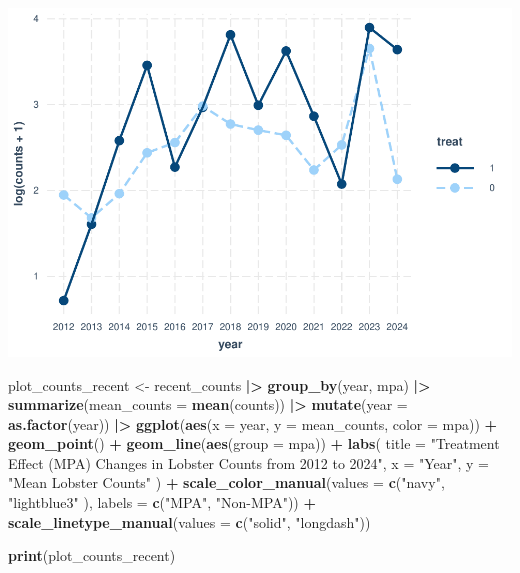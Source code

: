 \documentclass[
]{article}
\newenvironment{Shaded}{\begin{snugshade}}{\end{snugshade}}
\newcommand{\AttributeTok}[1]{\textcolor[rgb]{0.13,0.29,0.53}{#1}}
\newcommand{\FunctionTok}[1]{\textcolor[rgb]{0.13,0.29,0.53}{\textbf{#1}}}
\newcommand{\NormalTok}[1]{#1}
\newcommand{\OtherTok}[1]{\textcolor[rgb]{0.56,0.35,0.01}{#1}}
\newcommand{\SpecialCharTok}[1]{\textcolor[rgb]{0.81,0.36,0.00}{\textbf{#1}}}
\newcommand{\StringTok}[1]{\textcolor[rgb]{0.31,0.60,0.02}{#1}}
\begin{document}
\includegraphics{hw1-lobstrs-eds241_files/figure-latex/unnamed-chunk-46-1.pdf}

\begin{Shaded}
\begin{Highlighting}[]
\NormalTok{plot\_counts\_recent }\OtherTok{\textless{}{-}}\NormalTok{ recent\_counts }\SpecialCharTok{|\textgreater{}} 
    \FunctionTok{group\_by}\NormalTok{(year, mpa) }\SpecialCharTok{|\textgreater{}} 
    \FunctionTok{summarize}\NormalTok{(}\AttributeTok{mean\_counts =} \FunctionTok{mean}\NormalTok{(counts)) }\SpecialCharTok{|\textgreater{}} 
    \FunctionTok{mutate}\NormalTok{(}\AttributeTok{year =} \FunctionTok{as.factor}\NormalTok{(year)) }\SpecialCharTok{|\textgreater{}} 
    \FunctionTok{ggplot}\NormalTok{(}\FunctionTok{aes}\NormalTok{(}\AttributeTok{x =}\NormalTok{ year, }\AttributeTok{y =}\NormalTok{ mean\_counts, }\AttributeTok{color =}\NormalTok{ mpa)) }\SpecialCharTok{+}
    \FunctionTok{geom\_point}\NormalTok{() }\SpecialCharTok{+}
    \FunctionTok{geom\_line}\NormalTok{(}\FunctionTok{aes}\NormalTok{(}\AttributeTok{group =}\NormalTok{ mpa)) }\SpecialCharTok{+}
    \FunctionTok{labs}\NormalTok{(}
        \AttributeTok{title =} \StringTok{"Treatment Effect (MPA) Changes in Lobster Counts from 2012 to 2024"}\NormalTok{,}
        \AttributeTok{x =} \StringTok{"Year"}\NormalTok{,}
        \AttributeTok{y =} \StringTok{"Mean Lobster Counts"}
\NormalTok{    ) }\SpecialCharTok{+}
    \FunctionTok{scale\_color\_manual}\NormalTok{(}\AttributeTok{values =} \FunctionTok{c}\NormalTok{(}\StringTok{"navy"}\NormalTok{, }\StringTok{"lightblue3"}\NormalTok{ ),}
                       \AttributeTok{labels =} \FunctionTok{c}\NormalTok{(}\StringTok{"MPA"}\NormalTok{, }\StringTok{"Non{-}MPA"}\NormalTok{)) }\SpecialCharTok{+}
    \FunctionTok{scale\_linetype\_manual}\NormalTok{(}\AttributeTok{values =} \FunctionTok{c}\NormalTok{(}\StringTok{"solid"}\NormalTok{, }\StringTok{"longdash"}\NormalTok{))}

\FunctionTok{print}\NormalTok{(plot\_counts\_recent)}
\end{Highlighting}
\end{Shaded}
\end{document}
